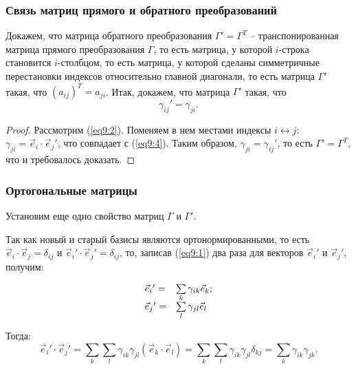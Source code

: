 \subsubsection{Связь матриц прямого и обратного преобразований}
	
	Докажем, что матрица обратного преобразования \( \Gamma' = \Gamma^T \) -- транспонированная матрица прямого преобразования \( \Gamma \), то есть матрица, у которой \( i \)-строка становится \( i \)-столбцом, то есть матрица, у которой сделаны симметричные перестановки индексов относительно главной диагонали, то есть матрица \( \Gamma' \) такая, что \( (a_{ij})^T = a_{ji} \).
	Итак, докажем, что матрица \( \Gamma' \) такая, что
	\begin{equation}
	\gamma_{ij}' = \gamma_{ji}. \label{eq9:5}
	\end{equation}
	
	\begin{proof}
	
	Рассмотрим (\ref{eq9:2}). Поменяем в нем местами индексы \( i \leftrightarrow j \): \( \gamma_{ji} = \vec{e}_i\cdot\vec{e}_j{'} \), что совпадает с (\ref{eq9:4}).
	Таким образом, \( \gamma_{ji} = \gamma_{ij}' \), то есть \( \Gamma' = \Gamma^T \), что и требовалось доказать.
	\end{proof}
			
\subsubsection{Ортогональные матрицы}

	Установим еще одно свойство матриц \( \Gamma \) и \( \Gamma' \).
	
	Так как новый и старый базисы являются ортонормированными, то есть \( \vec{e}_i \cdot \vec{e}_j = \delta_{ij} \) и \( \vec{e}_i{'}\cdot\vec{e}_j{'} = \delta_{ij} \), то, записав (\ref{eq9:1}) два раза для векторов \( \vec{e}_i{'} \) и \( \vec{e}_j{'} \), получим:
	
	\[ \begin{array}{l l}
	\vec{e}_i{'} = & \sum\limits_k\gamma_{ik}\vec{e}_k; \\
	\vec{e}_j{'} = & \sum\limits_l\gamma_{jl}\vec{e}_l
	\end{array} \]
	
	Тогда:
	\[ \vec{e}_i{'}\cdot\vec{e}_j{'} = \sum\limits_k \sum\limits_l \gamma_{ik}\gamma_{jl} (\vec{e}_k\cdot\vec{e}_l) = \sum\limits_k \sum\limits_l \gamma_{ik}\gamma_{jl}\delta_{kj} = \sum\limits_k \gamma_{ik}\gamma_{jk}. \]
	
